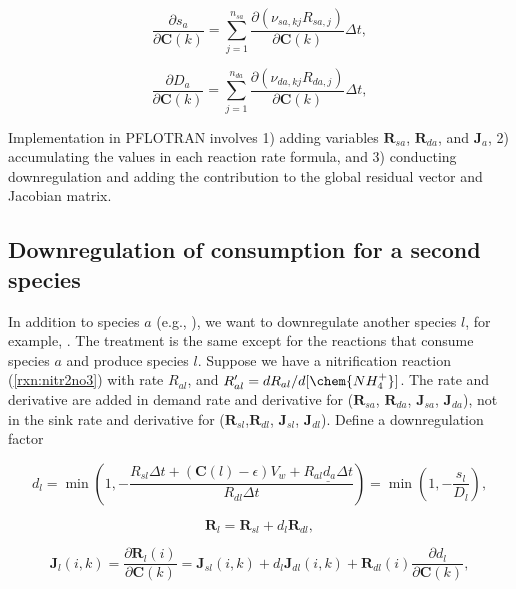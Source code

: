 \documentclass[gmd, manuscript]{copernicus}
\begin{document}
\begin{equation}
\frac{\partial s_a}{\partial \mathbf{C}(k)} =\sum_{j=1}^{n_{sa}}
\frac{\partial (\nu_{sa,kj}R_{sa,j})}{\partial \mathbf{C}(k)} \Delta t, 
\end{equation}

\begin{equation}
\frac{\partial D_a}{\partial \mathbf{C}(k)} =\sum_{j=1}^{n_{da}}
\frac{\partial (\nu_{da,kj}R_{da,j})}{\partial \mathbf{C}(k)} \Delta t, 
\end{equation}

Implementation in PFLOTRAN involves 1) adding variables $\mathbf{R}_{sa}$,
$\mathbf{R}_{da}$, and $\mathbf{J}_a$, 2) accumulating the values in each
reaction rate formula, and 3) conducting downregulation and adding the
contribution to the global residual vector and Jacobian matrix. 

\subsection{Downregulation of consumption for a second species}
In addition to species $a$ (e.g., ), we want to downregulate
another species $l$, for example, . The treatment is the same
except for the reactions that consume species $a$ and produce species $l$.
Suppose we have a nitrification reaction (\ref{rxn:nitr2no3}) with rate
$R_{al}$, and $R_{al}' = dR_{al}/d[\chem{NH_4^+}]$. The rate and derivative are
added in demand rate and derivative for  ($\mathbf{R}_{sa}$,
$\mathbf{R}_{da}$, $\mathbf{J}_{sa}$, $\mathbf{J}_{da}$), not in the sink rate
and derivative for  ($\mathbf{R}_{sl}$,$\mathbf{R}_{dl}$,
$\mathbf{J}_{sl}$, $\mathbf{J}_{dl}$). Define a downregulation factor 

\begin{equation}
d_l=\min\left(1, -\frac{R_{sl} \Delta t + (\mathbf{C}(l)-\epsilon) V_w +
\underline{R_{al}d_a\Delta t}} {R_{dl} \Delta t}\right)=\min(1,
-\frac{s_l}{D_l}),
\end{equation}

\begin{equation}
\mathbf{R}_l=\mathbf{R}_{sl}+d_l \mathbf{R}_{dl},
\end{equation}

\begin{equation}
\mathbf{J}_l (i,k)=\frac{\partial \mathbf{R}_l(i)}{\partial \mathbf{C}(k)}
=\mathbf{J}_{sl} (i,k)+d_l \mathbf{J}_{dl} (i,k)+\mathbf{R}_{dl} (i)
\frac{\partial d_l}{\partial \mathbf{C}(k)}, 
\end{equation}
\end{document}
